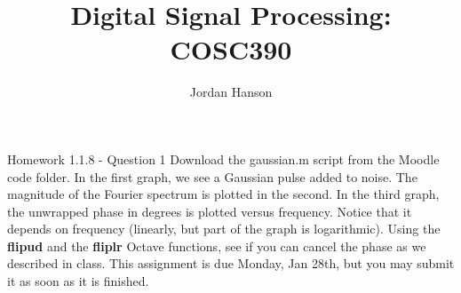 \documentclass{beamer}
\title{Digital Signal Processing: COSC390}
\author{Jordan Hanson}
\institute{Whittier College Department of Physics and Astronomy}
\begin{document}
\maketitle

\begin{frame}{Homework 1.1.8 - Question 1}
\small
Download the gaussian.m script from the Moodle code folder.  In the first graph, we see a Gaussian pulse added to noise.  The magnitude of the Fourier spectrum is plotted in the second.  In the third graph, the unwrapped phase in degrees is plotted versus frequency.  Notice that it depends on frequency (linearly, but part of the graph is logarithmic).  Using the \textbf{flipud} and the \textbf{fliplr} Octave functions, see if you can cancel the phase as we described in class.  This assignment is due Monday, Jan 28th, but you may submit it as soon as it is finished.
\end{frame}
\end{document}
